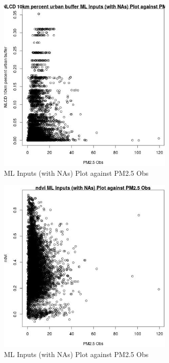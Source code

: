 \begin{figure} 
\centering  
\includegraphics[width=0.77\textwidth]{Code_Outputs/Report_ML_input_PM25_Step4_part_e_de_duplicated_aves_compiled_2019-05-18wNAs_NLCD_10km_percent_urban_buffervPM25_Obs.jpg} 
\caption{\label{fig:Report_ML_input_PM25_Step4_part_e_de_duplicated_aves_compiled_2019-05-18wNAsNLCD_10km_percent_urban_buffervPM25_Obs}ML Inputs (with NAs) Plot against PM2.5 Obs} 
\end{figure} 
 

\clearpage 

\begin{figure} 
\centering  
\includegraphics[width=0.77\textwidth]{Code_Outputs/Report_ML_input_PM25_Step4_part_e_de_duplicated_aves_compiled_2019-05-18wNAs_ndvivPM25_Obs.jpg} 
\caption{\label{fig:Report_ML_input_PM25_Step4_part_e_de_duplicated_aves_compiled_2019-05-18wNAsndvivPM25_Obs}ML Inputs (with NAs) Plot against PM2.5 Obs} 
\end{figure} 
 
